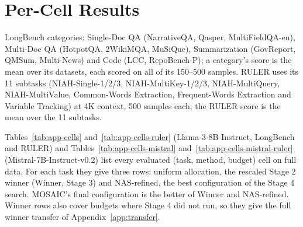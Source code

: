 \clearpage
\appendix

\section{Per-Cell Results}
\label{app:cells}


LongBench categories: Single-Doc QA (NarrativeQA, Qasper, MultiFieldQA-en), Multi-Doc QA (HotpotQA, 2WikiMQA, MuSiQue), Summarization (GovReport, QMSum, Multi-News) and Code (LCC, RepoBench-P); a category's score is the mean over its datasets, each scored on all of its 150--500 samples. RULER uses its 11 subtasks (NIAH-Single-1/2/3, NIAH-MultiKey-1/2/3, NIAH-MultiQuery, NIAH-MultiValue, Common-Words Extraction, Frequent-Words Extraction and Variable Tracking) at 4K context, 500 samples each; the RULER score is the mean over the 11 subtasks.

Tables~\ref{tab:app-cells} and~\ref{tab:app-cells-ruler} (Llama-3-8B-Instruct, LongBench and RULER) and Tables~\ref{tab:app-cells-mistral} and~\ref{tab:app-cells-mistral-ruler} (Mistral-7B-Instruct-v0.2) list every evaluated (task, method, budget) cell on full data. For each task they give three rows: uniform allocation, the rescaled Stage 2 winner (Winner, Stage 3) and NAS-refined, the best configuration of the Stage 4 search. MOSAIC's final configuration is the better of Winner and NAS-refined. Winner rows also cover budgets where Stage 4 did not run, so they give the full winner transfer of Appendix~\ref{app:transfer}.


